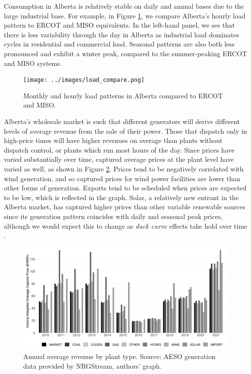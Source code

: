 \documentclass[12pt]{article}
\begin{document}
Consumption in Alberta is relatively stable on daily and annual bases due to the large industrial base. For example, in Figure \ref{fig:load_pattern}, we compare Alberta's hourly load pattern to ERCOT and MISO equivalents. In the left-hand panel, we see that there is less variability through the day in Alberta as industrial load dominates cycles in residential and commercial load. Seasonal patterns are also both less pronounced and exhibit a winter peak, compared to the summer-peaking ERCOT and MISO systems.

\begin{figure}[!h]%
	\centering \vspace{-.25cm} \texttt{[image: ../images/load\_compare.png]}
\vspace{-0.75cm}	\caption{Monthly and hourly load patterns in Alberta compared to ERCOT and MISO.}
\label{fig:load_pattern}
\end{figure}

Alberta's wholesale market is such that different generators will derive different levels of average revenue from the sale of their power. Those that dispatch only in high-price times will have higher revenues on average than plants without dispatch control, or plants which run most hours of the day. Since prices have varied substantially over time, captured average prices at the plant level have varied as well, as shown in Figure \ref{fig:capture_prices}. Prices tend to be negatively correlated with wind generation, and so captured prices for wind power facilities are lower than other forms of generation. Exports tend to be scheduled when prices are expected to be low, which is reflected in the graph. Solar, a relatively new entrant in the Alberta market, has captured higher prices than other variable renewable sources since its generation pattern coincides with daily and seasonal peak prices, although we would expect this to change as \emph{duck curve} effects take hold over time \cite{rivers_stretching_2020}.

\begin{figure}[!h]%
	\centering \vspace{-.25cm} \includegraphics[width=6.5in]{../images/price_capture_all.png}
\vspace{-0.75cm}	\caption{Annual average revenue by plant type. Source: AESO generation data provided by NRGStream, authors' graph.}
\label{fig:capture_prices}
\end{figure}
\end{document}
